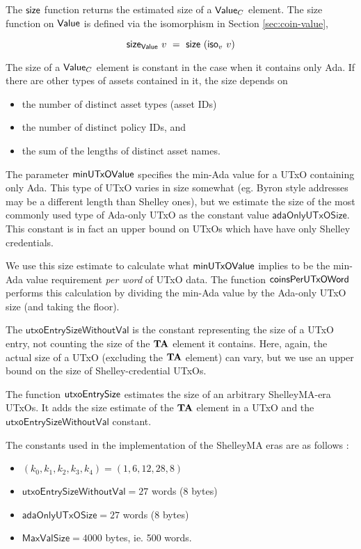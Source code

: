 The $\mathsf{size}$ function returns the estimated size of a $\mathsf{Value}_C$ element. The size
function on $\mathsf{Value}$ is defined via the isomorphism in Section \ref{sec:coin-value},

\[ \mathsf{size}_{\mathsf{Value}}~v~=~\mathsf{size}~(\mathsf{iso}_{v}~v) \]

The size of a $\mathsf{Value}_C$ element is constant in the case when it contains only Ada.
If there are other types of assets contained in it, the size depends on

\begin{itemize}
  \item the number of distinct asset types (asset IDs)
  \item the number of distinct policy IDs, and
  \item the sum of the lengths of distinct asset names.
\end{itemize}

The parameter $\mathsf{minUTxOValue}$ specifies the min-Ada value for a UTxO containing
only Ada. This type of UTxO varies in size somewhat (eg. Byron style addresses
may be a different length than Shelley ones), but we estimate the size of the most commonly
used type of Ada-only UTxO as the constant value $\mathsf{adaOnlyUTxOSize}$.
This constant is in fact an upper bound on UTxOs which have have only Shelley credentials.

We use this size estimate
to calculate what $\mathsf{minUTxOValue}$ implies to be the min-Ada value requirement
\emph{per word} of UTxO data.
The function $\mathsf{coinsPerUTxOWord}$ performs this calculation by dividing the
min-Ada value by the Ada-only UTxO size (and taking the floor).

The $\mathsf{utxoEntrySizeWithoutVal}$ is the constant representing
the size of a UTxO entry, not counting the size of the $\mathbf{TA}$ element it contains.
Here, again, the actual size of a UTxO (excluding the $\mathbf{TA}$ element) can vary, but
we use an upper bound on the size of Shelley-credential UTxOs.

The function $\mathsf{utxoEntrySize}$ estimates the size of an arbitrary ShelleyMA-era
UTxOs. It adds the size estimate of the $\mathbf{TA}$ element in a UTxO and the
$\mathsf{utxoEntrySizeWithoutVal}$ constant.

The constants used in the implementation of the ShelleyMA eras are as follows :

\begin{itemize}
  \item $(k_0, k_1, k_2, k_3, k_4) = (1, 6, 12, 28, 8)$
  \item $\mathsf{utxoEntrySizeWithoutVal} = 27$ words (8 bytes)
  \item $\mathsf{adaOnlyUTxOSize} = 27$ words (8 bytes)
  \item $\mathsf{MaxValSize} = 4000$ bytes, ie. 500 words.
\end{itemize}
